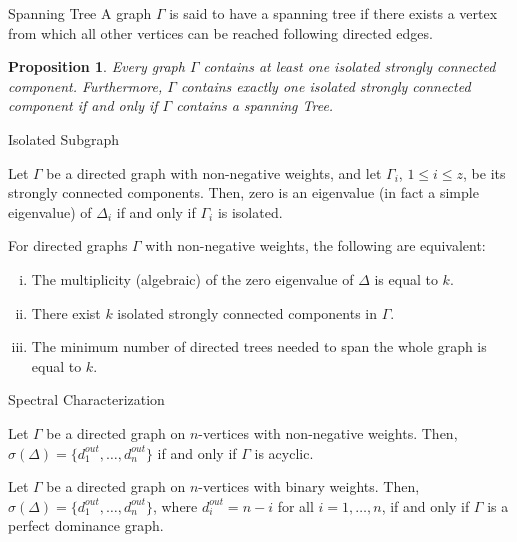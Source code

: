 \documentclass{beamer}
\newtheorem{proposition}[theorem]{Proposition}
\begin{document}
\begin{frame}{Spanning Tree}
A graph $\Gamma$ is said to have a spanning tree if there exists a vertex from which all other vertices can be reached following directed edges.
\vfill
\begin{proposition}
Every graph $\Gamma$ contains at least one isolated strongly connected component. 
Furthermore, $\Gamma$ contains exactly one isolated strongly connected component if and only if $\Gamma$ contains a spanning Tree.
\end{proposition}
\end{frame}

\begin{frame}{Isolated Subgraph}
\begin{theorem}
Let $\Gamma$ be a directed graph with non-negative weights, and let $\Gamma_{i}$, $1\leq i\leq z$, be its strongly connected components.
Then, zero is an eigenvalue (in fact a simple eigenvalue) of $\Delta_{i}$ if and only if $\Gamma_{i}$ is isolated. 
\end{theorem}
\vfill
\begin{corollary}
For directed graphs $\Gamma$ with non-negative weights, the following are equivalent:
\begin{enumerate}[i.]
\item	The multiplicity (algebraic) of the zero eigenvalue of $\Delta$ is equal to $k$.
\item	There exist $k$ isolated strongly connected components in $\Gamma$.
\item	The minimum number of directed trees needed to span the whole graph is equal to $k$. 
\end{enumerate}
\end{corollary}
\vfill
\end{frame}

\begin{frame}{Spectral Characterization}
\begin{theorem}
Let $\Gamma$ be a directed graph on $n$-vertices with non-negative weights.
Then, $\sigma(\Delta)=\{d_{1}^{out},\ldots,d_{n}^{out}\}$ if and only if $\Gamma$ is acyclic.
\end{theorem}
\vfill
\begin{corollary}
Let $\Gamma$ be a directed graph on $n$-vertices with binary weights.
Then, $\sigma(\Delta)=\{d_{1}^{out},\ldots,d_{n}^{out}\}$, where $d_{i}^{out}=n-i$ for all $i=1,\ldots,n$, if and only if $\Gamma$ is a perfect dominance graph. 
\end{corollary}
\end{frame}
\end{document}
